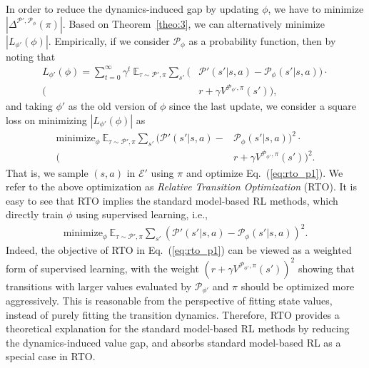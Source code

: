 \documentclass[letterpaper]{article} %
\def\E{{\mathbb{E}}}
\def\P{{\mathcal{P}}}
\begin{document}
In order to reduce the dynamics-induced gap by updating $\phi$, we have to minimize $|\Delta^{\P',\P_{\phi}}(\pi)|$. 
Based on Theorem~\ref{theo:3}, we can alternatively minimize $|L_{\phi'}(\phi)|$. Empirically, if we consider $\P_{\phi}$ as a probability function, then by noting that
{\small
\begin{align}
L_{\phi'}(\phi)=
\sum_{t=0}^{\infty}
\gamma^t\ 
\E_{\tau \sim \P',\pi}
\sum_{s'}
\big(
&\P'(s'|s,a) - \P_{\phi}(s'|s,a)
\big) \cdot  \nonumber \\
\big(
&r+\gamma V^{\P_{\phi'},\pi}(s')
\big),
\end{align}
}and taking $\phi'$ as the old version of $\phi$ since the last update, we consider a square loss on minimizing $|L_{\phi'}(\phi)|$ as
{\small
\begin{align}
\text{minimize}_{\phi}\ 
\E_{\tau \sim \P',\pi}
\sum_{s'} 
\big(\P'(s'|s,a)-&\P_{\phi}(s'|s,a)\big)^2 \cdot \nonumber \\
\big(
&r+\gamma V^{\P_{\phi'},\pi}(s')
\big)^2.
\label{eq:rto_p1}
\end{align}
}That is, we sample $(s,a)$ in $\mathcal{E}'$ using $\pi$ and optimize Eq.~(\ref{eq:rto_p1}). 
We refer to the above optimization as \emph{Relative Transition Optimization} (RTO).
It is easy to see that RTO implies the standard model-based RL methods, which directly train $\phi$ using supervised learning, i.e.,
{\small
\begin{equation}
\begin{aligned}
\text{minimize}_{\phi} \ \E_{\tau \sim \P',\pi}\sum_{s'}
\left(\P'(s'|s,a)-\P_{\phi}(s'|s,a)\right)^2.
\end{aligned}
\end{equation}
}Indeed, the objective of RTO in Eq.~(\ref{eq:rto_p1}) can be viewed as a weighted form of supervised learning, with the weight $(r+\gamma V^{\P_{\phi'},\pi}(s'))^2$ showing that transitions with larger values evaluated by $\P_{\phi'}$ and $\pi$ should be optimized more aggressively. This is reasonable from the perspective of fitting state values, instead of purely fitting the transition dynamics. Therefore, RTO provides a theoretical explanation for the standard model-based RL methods by reducing the dynamics-induced value gap, and absorbs standard model-based RL as a special case in RTO.
\end{document}
